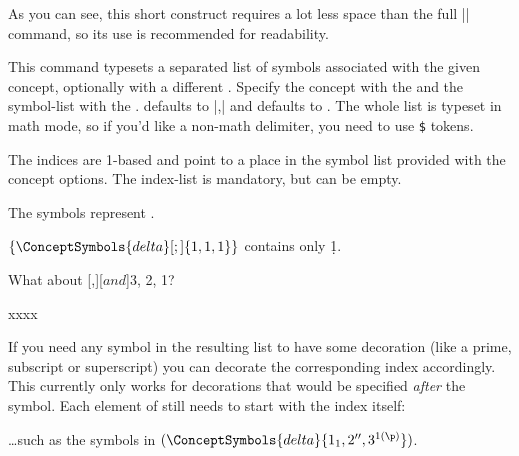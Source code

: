 \documentclass[a4paper]{packagedoc}
\begin{document}
As you can see, this short construct requires a lot less space than the
full |\ConceptSymbol| command, so its use is recommended for readability.



This command typesets a  separated list of symbols associated
with the given concept, optionally with a different . Specify
the concept with the  and the symbol-list with the
.  defaults to |,| and 
defaults to . The whole list is typeset in math mode, so if
you'd like a non-math delimiter, you need to use \verb|$| tokens.

The indices are 1-based and point to a place in the symbol list provided with the
concept options. The index-list is mandatory, but can be empty.

\begin{latex-example-show}
The symbols  represent \delta*.
\end{latex-example-show}
%
\begin{latex-example-show}
$\{\ConceptSymbols{delta}[;]{1,1,1}\}$ contains only \d1.
\end{latex-example-show}
%
\begin{latex-example-show}
What about [,][$ and $]{3, 2, 1}?
\end{latex-example-show}
%
\begin{latex-example-show}
xxxx
\end{latex-example-show}

If you need any symbol in the resulting list to have some decoration (like a
prime, subscript or superscript) you can decorate the corresponding index
accordingly. This currently only works for decorations that would be specified
\emph{after} the symbol. Each element of  still needs to
start with the index itself:

\begin{latex-example-show}
\ldots such as the symbols in
  $(\ConceptSymbols{delta}{1_1, 2'', 3^{\d1(\p)}})$.
\end{latex-example-show}

\end{document}
